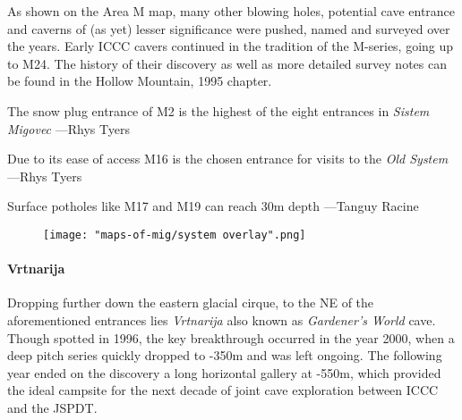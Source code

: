 As shown on the Area M map, many other blowing holes, potential cave entrance and caverns of (as yet) lesser significance were pushed, named and surveyed over the years. Early ICCC cavers continued in the tradition of the M-series, going up to M24. The history of their discovery as well as more detailed survey notes can be found in the Hollow Mountain, 1995 chapter.

\begin{marginfigure}
\checkoddpage \ifoddpage \forcerectofloat \else \forceversofloat \fi
\centering
 \caption{The snow plug entrance of M2 is the highest of the eight entrances in \emph{Sistem Migovec} ---Rhys Tyers}
 \label{surfaceM16}
\end{marginfigure}

\begin{marginfigure}
\checkoddpage \ifoddpage \forcerectofloat \else \forceversofloat \fi
\centering
 \caption{Due to its ease of access M16 is the chosen entrance for visits to the \emph{Old System} ---Rhys Tyers}
 \label{surfaceM16}
\end{marginfigure}


\begin{marginfigure}
\checkoddpage \ifoddpage \forcerectofloat \else \forceversofloat \fi
\centering
 \caption{Surface potholes like M17 and M19 can reach 30m depth ---Tanguy Racine}
 \label{surfaceM17}
\end{marginfigure}


 \begin{figure*}[t!]
 \checkoddpage \ifoddpage \forcerectofloat \else \forceversofloat \fi
\centering
  \texttt{[image: "maps-of-mig/system overlay".png]}
  \label{map m}
 \end{figure*}
\paragraph{Vrtnarija} Dropping further down the eastern glacial cirque, to the NE of the aforementioned entrances lies \emph{Vrtnarija} also known as  \emph{Gardener's World} cave. Though spotted in 1996, the key breakthrough occurred in the year 2000, when a deep pitch series quickly dropped to -350m and was left ongoing. The following year ended on the discovery a long horizontal gallery at -550m, which provided the ideal campsite for the next decade of joint cave exploration between ICCC and the JSPDT.


